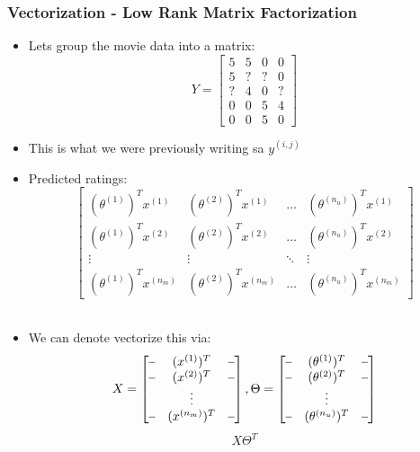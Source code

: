\subsubsection{Vectorization - Low Rank Matrix Factorization}
\begin{itemize}[--]
	\item Lets group the movie data into a matrix:
		$$Y=\begin{bmatrix}
			5 & 5 & 0 & 0 \\
			5 & ? & ? & 0 \\
			? & 4 & 0 & ? \\
			0 & 0 & 5 & 4 \\
			0 & 0 & 5 & 0
		\end{bmatrix}$$
	\item This is what we were previously writing sa $y^{(i,j)}$
	\item Predicted ratings:
		$$\begin{bmatrix}
			(\theta^{(1)})^Tx^{(1)} & (\theta^{(2)})^Tx^{(1)} & \ldots & (\theta^{(n_u)})^Tx^{(1)} \\
			(\theta^{(1)})^Tx^{(2)} & (\theta^{(2)})^Tx^{(2)} & \ldots & (\theta^{(n_u)})^Tx^{(2)} \\
			\vdots & \vdots & \ddots & \vdots \\
			(\theta^{(1)})^Tx^{(n_m)} & (\theta^{(2)})^Tx^{(n_m)} & \ldots & (\theta^{(n_u)})^Tx^{(n_m)}
		\end{bmatrix}$$\
	\item We can denote vectorize this via:
		$$X=\begin{bmatrix}
			\rule[.5ex]{.5em}{0.4pt} & (x^{(1)})^T & \rule[.5ex]{.5em}{0.4pt} \\
			\rule[.5ex]{.5em}{0.4pt} & (x^{(2)})^T & \rule[.5ex]{.5em}{0.4pt} \\
			& \vdots \\
			\rule[.5ex]{.5em}{0.4pt} & (x^{(n_m)})^T & \rule[.5ex]{.5em}{0.4pt} \\
		\end{bmatrix}, \Theta=\begin{bmatrix}
			\rule[.5ex]{.5em}{0.4pt} & (\theta^{(1)})^T & \rule[.5ex]{.5em}{0.4pt} \\
			\rule[.5ex]{.5em}{0.4pt} & (\theta^{(2)})^T & \rule[.5ex]{.5em}{0.4pt} \\
			& \vdots \\
			\rule[.5ex]{.5em}{0.4pt} & (\theta^{(n_u)})^T & \rule[.5ex]{.5em}{0.4pt} \\
		\end{bmatrix}$$
		$$X\Theta^T$$

\end{itemize}
